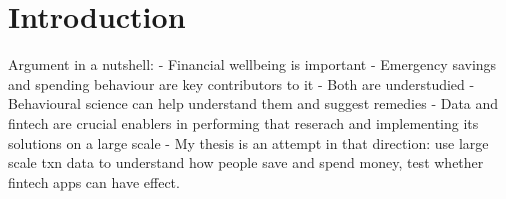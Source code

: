 
\chapter{Introduction}%
\label{cha:introduction}

Argument in a nutshell:
- Financial wellbeing is important
- Emergency savings and spending behaviour are key contributors to it
- Both are understudied
- Behavioural science can help understand them and suggest remedies
- Data and fintech are crucial enablers in performing that reserach and
implementing its solutions on a large scale
- My thesis is an attempt in that direction: use large scale txn data to
understand how people save and spend money, test whether fintech apps can have
effect.






